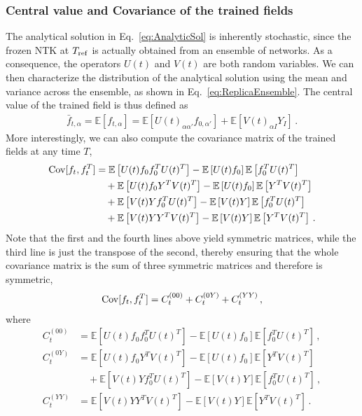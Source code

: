 \subsubsection{Central value and Covariance of the trained fields}
\label{sec:CentralAndCovariance}

The analytical solution in Eq.~\eqref{eq:AnalyticSol} is inherently stochastic,
since the frozen NTK at $T_{\rm ref}$ is actually obtained from an ensemble of
networks. As a consequence, the operators $U(t)$ and $V(t)$ are both random
variables. We can then characterize the distribution of the analytical solution
using the mean and variance across the ensemble, as shown in
Eq.~\eqref{eq:ReplicaEnsemble}. The central value of the trained field is thus
defined as
\begin{align}
    \label{eq:MeanValAtT}
    \bar{f}_{t,\alpha} = \mathbb{E}\left[f_{t,\alpha}\right]
        = \mathbb{E}\left[U(t)_{\alpha\alpha'} f_{0,\alpha'}\right]
            + \mathbb{E}\left[V(t)_{\alpha I} Y_I\right] \, .
\end{align}
More interestingly, we can also compute the covariance matrix of the trained
fields at any time $T$,
\begin{align}
    \mathrm{Cov}[f_t,f_t^T]
        &= \mathbb{E}\left[U(t) f_0 f_0^T U(t)^T\right] 
            - \mathbb{E}\left[U(t) f_0\right] \mathbb{E}\left[f_0^T U(t)^T\right]  \nonumber \\
        &\quad + \mathbb{E}\left[U(t) f_0 Y^T V(t)^T\right] 
            - \mathbb{E}\left[U(t) f_0\right] \mathbb{E}\left[Y^T V(t)^T\right] \nonumber \\
        &\quad + \mathbb{E}\left[V(t) Y f_0^T U(t)^T\right]
            - \mathbb{E}\left[V(t) Y\right] \mathbb{E}\left[f_0^T U(t)^T\right] \nonumber \\
    \label{eq:CovAtT}
        &\quad + \mathbb{E}\left[V(t) Y Y^T V(t)^T\right]
            - \mathbb{E}\left[V(t) Y\right] \mathbb{E}\left[Y^T V(t)^T\right] \, .
\end{align}
Note that the first and the fourth lines above yield symmetric matrices, while
the third line is just the transpose of the second, thereby ensuring that the
whole covariance matrix is the sum of three symmetric matrices and therefore is
symmetric, 
\begin{align}
    \label{eq:SumOfCovariances}
    \mathrm{Cov}[f_t,f_t^T] = C_t^{(00)} + C_t^{(0Y)} + C_t^{(YY)}\, ,
\end{align}
where
\begin{align}
    \label{eq:C00term}
    C_t^{(00)} 
        &= \mathbb{E}\left[U(t) f_0 f_0^T U(t)^T\right] 
        - \mathbb{E}\left[U(t) f_0\right] \mathbb{E}\left[f_0^T U(t)^T\right]\, ,\\
    C_t^{(0Y)}
        &= \mathbb{E}\left[U(t) f_0 Y^T V(t)^T\right] 
        - \mathbb{E}\left[U(t) f_0\right] \mathbb{E}\left[Y^T V(t)^T\right] \nonumber \\
        \label{eq:C0Yterm}
        &\quad + \mathbb{E}\left[V(t) Y f_0^T U(t)^T\right]
            - \mathbb{E}\left[V(t) Y\right] \mathbb{E}\left[f_0^T U(t)^T\right] \, ,\\
    C_t^{(YY)}
        &= \mathbb{E}\left[V(t) Y Y^T V(t)^T\right]
        - \mathbb{E}\left[V(t) Y\right] \mathbb{E}\left[Y^T V(t)^T\right]\, .
\end{align}

